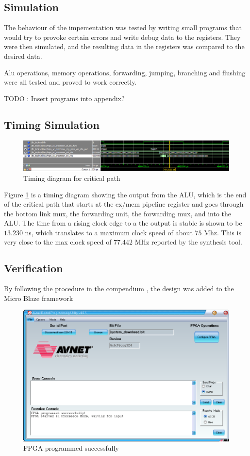 \subsection{Simulation}

The behaviour of the impementation was tested by writing small programs that would try to provoke certain errors and write debug data to the registers. They were then simulated, and the resulting data in the registers was compared to the desired data.

Alu operations, memory operations, forwarding, jumping, branching and flushing were all tested and proved to work correctly.

TODO : Insert programs into appendix?

\subsection{Timing Simulation}

\begin{figure}[ht]
    \centering
    \includegraphics[scale=0.5]{figures/TimingSimulation.png}
    \caption{Timing diagram for critical path} 
    \label{fig:timing}
\end{figure}

Figure \ref{fig:timing} is a timing diagram showing the output from the ALU, which is the end of the critical path that starts at the ex/mem pipeline register and goes through the bottom link mux, the forwarding unit, the forwarding mux, and into the ALU.
The time from a rising clock edge to a the output is stable is shown to be $13.230$ ns, which translates to a maximum clock speed of about $75$ Mhz.
This is very close to the max clock speed of $77.442$ MHz reported by the synthesis tool.

\subsection{Verification}

By following the procedure in the compendium \cite[p.47]{lab-compendium}, the design was added to the Micro Blaze framework

\begin{figure}[ht]
    \centering
    \includegraphics[scale=0.5]{figures/AVNET.png}
    \caption{FPGA programmed successfully} 
    \label{fig:avprog}
\end{figure}


